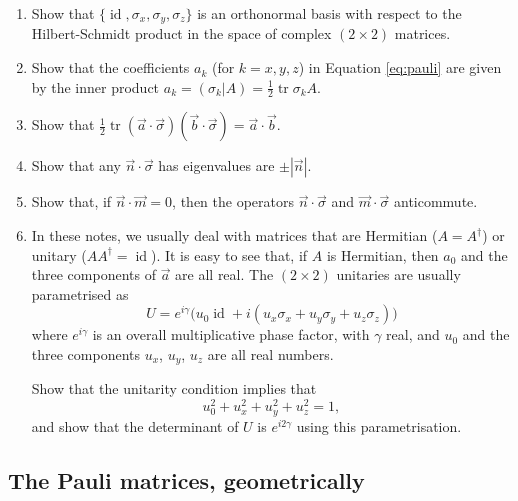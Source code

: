 \documentclass{article}
\begin{document}
\begin{enumerate}
\def\labelenumi{\arabic{enumi}.}
\item
  Show that \(\{\operatorname{id},\sigma_x,\sigma_y,\sigma_z\}\) is an orthonormal basis with respect to the Hilbert-Schmidt product in the space of complex \((2\times 2)\) matrices.
\item
  Show that the coefficients \(a_k\) (for \(k=x,y,z\)) in Equation \eqref{eq:pauli} are given by the inner product \(a_k = (\sigma_k|A) = \frac12\operatorname{tr}\sigma_k A\).
\item
  Show that \(\frac12\operatorname{tr}(\vec{a}\cdot\vec{\sigma})(\vec{b}\cdot\vec{\sigma}) = \vec{a}\cdot\vec{b}\).
\item
  Show that any \(\vec{n}\cdot\vec{\sigma}\) has eigenvalues are \(\pm|\vec{n}|\).
\item
  Show that, if \(\vec{n}\cdot\vec{m}=0\), then the operators \(\vec{n}\cdot\vec{\sigma}\) and \(\vec{m}\cdot\vec{\sigma}\) anticommute.
\item
  In these notes, we usually deal with matrices that are Hermitian (\(A=A^\dagger\)) or unitary (\(AA^\dagger=\operatorname{id}\)).
  It is easy to see that, if \(A\) is Hermitian, then \(a_0\) and the three components of \(\vec{a}\) are all real.
  The \((2\times 2)\) unitaries are usually parametrised as
  \[
     U = e^{i\gamma}\Big(u_0\operatorname{id}+ i(u_x\sigma_x + u_y\sigma_y + u_z\sigma_z)\Big)
   \]
  where \(e^{i\gamma}\) is an overall multiplicative phase factor, with \(\gamma\) real, and \(u_0\) and the three components \(u_x\), \(u_y\), \(u_z\) are all real numbers.

  Show that the unitarity condition implies that
  \[
     u_0^2 + u_x^2 + u_y^2 + u_z^2 = 1,
   \]
  and show that the determinant of \(U\) is \(e^{i2\gamma}\) using this parametrisation.
\end{enumerate}

\hypertarget{the-pauli-matrices-geometrically}{%
\subsection{The Pauli matrices, geometrically}\label{the-pauli-matrices-geometrically}}
\end{document}
